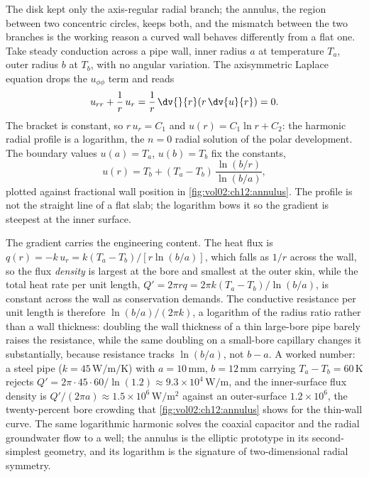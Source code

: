 The disk kept only the axis-regular radial branch; the annulus, the
region between two concentric circles, keeps both, and the mismatch
between the two branches is the working reason a curved wall behaves
differently from a flat one. Take steady conduction across a pipe
wall, inner radius $a$ at temperature $T_{a}$, outer radius $b$ at
$T_{b}$, with no angular variation. The axisymmetric Laplace equation
drops the $u_{\phi\phi}$ term and reads
\[
u_{rr} + \frac{1}{r}\, u_{r} = \frac{1}{r}\,\dv{}{r}\!\left(r\,\dv{u}{r}\right) = 0.
\]
The bracket is constant, so $r\, u_{r} = C_{1}$ and
$u(r) = C_{1}\ln r + C_{2}$: the harmonic radial profile is a
logarithm, the $n = 0$ radial solution of the polar development. The
boundary values $u(a) = T_{a}$, $u(b) = T_{b}$ fix the constants,
\[
u(r) = T_{b} + (T_{a} - T_{b})\,\frac{\ln(b/r)}{\ln(b/a)},
\]
plotted against fractional wall position in
\cref{fig:vol02:ch12:annulus}. The profile is not the straight line
of a flat slab; the logarithm bows it so the gradient is steepest at
the inner surface.

The gradient carries the engineering content. The heat flux is
$q(r) = -k\, u_{r} = k(T_{a} - T_{b})/[r\ln(b/a)]$, which falls as
$1/r$ across the wall, so the flux \emph{density} is largest at the
bore and smallest at the outer skin, while the total heat rate per
unit length, $Q' = 2\pi r q = 2\pi k(T_{a} - T_{b})/\ln(b/a)$, is
constant across the wall as conservation demands. The conductive
resistance per unit length is therefore $\ln(b/a)/(2\pi k)$, a
logarithm of the radius ratio rather than a wall thickness: doubling
the wall thickness of a thin large-bore pipe barely raises the
resistance, while the same doubling on a small-bore capillary changes
it substantially, because resistance tracks $\ln(b/a)$, not $b - a$.
A worked number: a steel pipe ($k = 45\,\si{\watt\per\meter\per
\kelvin}$) with $a = 10\,\si{\milli\meter}$, $b = 12\,\si{\milli
\meter}$ carrying $T_{a} - T_{b} = 60\,\si{\kelvin}$ rejects
$Q' = 2\pi\cdot 45\cdot 60/\ln(1.2) \approx 9.3\times
10^{4}\,\si{\watt\per\meter}$, and the inner-surface flux density is
$Q'/(2\pi a) \approx 1.5\times 10^{6}\,\si{\watt\per\meter\squared}$
against an outer-surface $1.2\times 10^{6}$, the twenty-percent bore
crowding that \cref{fig:vol02:ch12:annulus} shows for the thin-wall
curve. The same logarithmic harmonic solves the coaxial capacitor and
the radial groundwater flow to a well; the annulus is the elliptic
prototype in its second-simplest geometry, and its logarithm is the
signature of two-dimensional radial symmetry.

